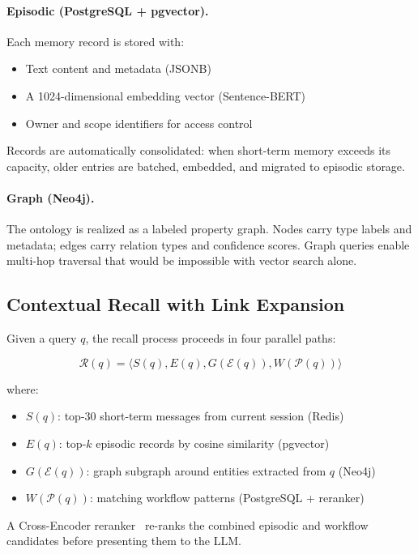 \documentclass[11pt,a4paper]{article}
\begin{document}
\paragraph{Episodic (PostgreSQL + pgvector).}
Each memory record is stored with:
\begin{itemize}
    \item Text content and metadata (JSONB)
    \item A 1024-dimensional embedding vector (Sentence-BERT)
    \item Owner and scope identifiers for access control
\end{itemize}
Records are automatically consolidated: when short-term memory exceeds its capacity, 
older entries are batched, embedded, and migrated to episodic storage.

\paragraph{Graph (Neo4j).}
The ontology is realized as a labeled property graph.
Nodes carry type labels and metadata; edges carry relation types and confidence scores.
Graph queries enable multi-hop traversal that would be impossible with vector search alone.

\subsection{Contextual Recall with Link Expansion}

Given a query $q$, the recall process proceeds in four parallel paths:

\begin{equation}
\mathcal{R}(q) = \langle S(q), E(q), G(\mathcal{E}(q)), W(\mathcal{P}(q)) \rangle
\end{equation}

where:
\begin{itemize}
    \item $S(q)$: top-30 short-term messages from current session (Redis)
    \item $E(q)$: top-$k$ episodic records by cosine similarity (pgvector)
    \item $G(\mathcal{E}(q))$: graph subgraph around entities extracted from $q$ (Neo4j)
    \item $W(\mathcal{P}(q))$: matching workflow patterns (PostgreSQL + reranker)
\end{itemize}

A Cross-Encoder reranker~\citep{nogueira2019passage} re-ranks the combined episodic 
and workflow candidates before presenting them to the LLM.
\end{document}
